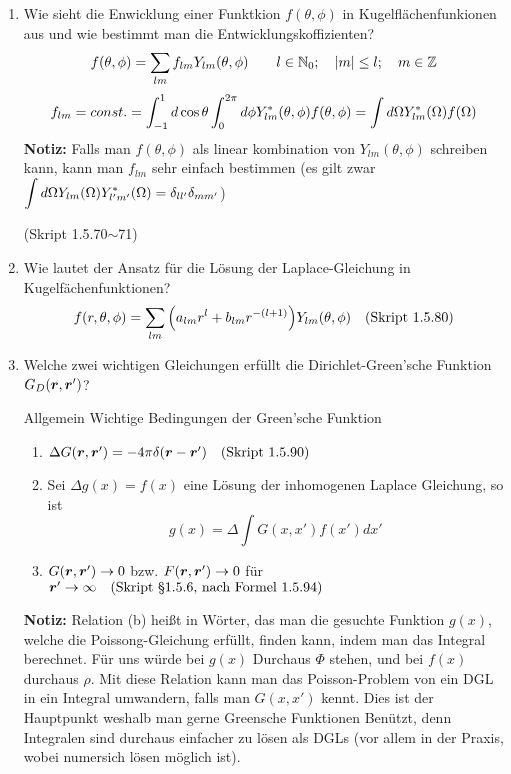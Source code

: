 \begin{enumerate}
  \item Wie sieht die Enwicklung einer Funktkion $f(\theta,\phi)$ in
        Kugelflächenfunkionen aus und wie bestimmt man die 
        Entwicklungskoffizienten?
        $$\displaystyle f(\theta, \phi)=\sum_{lm} f_{lm}Y_{lm}(\theta,\phi)
        \qquad l\in \mathbb{N}_0;\quad \abs{m}\le l; 
        \quad m\in\mathbb{Z}$$
        $$\displaystyle f_{lm}=const.
         =\int_{-1}^{1} d\cos\theta\int_0^{2\pi}d\phi 
         Y^*_{lm}(\theta,\phi)f(\theta,\phi)
         =\int d\Omega Y^*_{lm}(\Omega)f(\Omega)$$
         \textbf{Notiz:} Falls man $f(\theta,\phi)$ als linear kombination
         von $Y_{lm}(\theta,\phi)$ schreiben kann, kann man $f_{lm}$
         sehr einfach bestimmen (es gilt zwar $\displaystyle \int d\Omega 
         Y_{lm}(\Omega)Y_{l'm'}^*(\Omega)=\delta_{ll'}\delta_{mm'}$)
        \begin{center}
          (Skript 1.5.70$\sim$71)
        \end{center}

  \item Wie lautet der Ansatz für die Lösung der Laplace-Gleichung in
        Kugelfächenfunktionen?\\
        $$f(r,\theta,\phi)=
        \sum_{lm}\qty(a_{lm}r^l+b_{lm}r^{-(l+1)})Y_{lm}(\theta,\phi)
        \quad\text{(Skript 1.5.80)}$$
         
  \item Welche zwei wichtigen Gleichungen erfüllt die Dirichlet-Green'sche
        Funktion $G_D(\vb* r, \vb* r')$?

        Allgemein Wichtige Bedingungen der Green'sche Funktion
        \begin{center}
          \begin{enumerate}
            \item $\Delta G(\vb* r, \vb* r') = -4\pi\delta(\vb* r -\vb* r')
              \quad\text{(Skript 1.5.90)}$
            \item Sei $\Delta g(x) = f(x)$ eine Lösung der inhomogenen  
              Laplace Gleichung, so ist 
              $$ g(x)=\Delta\int G(x,x')f(x')dx'$$
            \item $G(\vb* r, \vb* r') \to 0$ bzw. $F(\vb* r, \vb* r')\to 0$ 
              für $\vb* r'\to\infty
              \quad\text{(Skript §1.5.6, nach Formel 1.5.94)}$
          \end{enumerate}
        \end{center}
        \textbf{Notiz:} Relation (b) heißt in Wörter, das man die gesuchte
        Funktion $g(x)$, welche die Poissong-Gleichung erfüllt, finden
        kann, indem man das Integral berechnet. Für uns würde bei $g(x)$
        Durchaus $\Phi$ stehen, und bei $f(x)$ durchaus $\rho$.
        Mit diese Relation kann man das 
        Poisson-Problem
        von ein DGL in ein Integral umwandern, falls man $G(x,x')$ kennt.
        Dies ist der Hauptpunkt weshalb man gerne Greensche Funktionen
        Benützt, denn Integralen sind durchaus einfacher 
        zu lösen als DGLs (vor allem in der Praxis, wobei numersich
        lösen möglich ist).


\end{enumerate}
